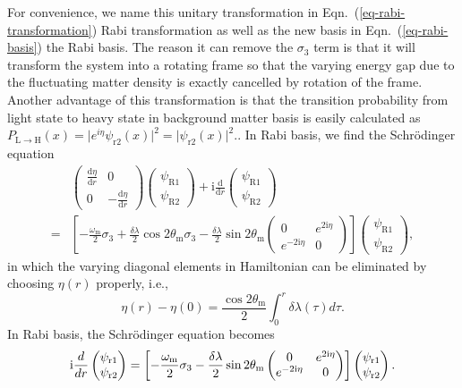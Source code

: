 For convenience, we name this unitary transformation in Eqn.~(\ref{eq-rabi-transformation}) Rabi transformation as well as the new basis in Eqn.~(\ref{eq-rabi-basis}) the Rabi basis. The reason it can remove the $\sigma_3$ term is that it will transform the system into a rotating frame so that the varying energy gap due to the fluctuating matter density is exactly cancelled by rotation of the frame. Another advantage of this transformation is that the transition probability from light state to heavy state in background matter basis is easily calculated as $P_{\mathrm{L} \to
\mathrm{H}} (x) = \lvert e^{i\eta} \psi_{\mathrm r2} (x)  \rvert^2 = \lvert \psi_{\mathrm r2} (x)  \rvert^2 .$. In Rabi basis, we find the Schr\"{o}dinger equation
\begin{align*}
    &\begin{pmatrix}  \frac{\mathrm d\eta}{\mathrm dr}  & 0 \\ 0 & - \frac{\mathrm d\eta}{\mathrm d r}  \end{pmatrix} \begin{pmatrix} \psi_{\mathrm R1} \\ \psi_{\mathrm R2} \end{pmatrix} + \mathrm i \frac{\mathrm d}{\mathrm dr} \begin{pmatrix} \psi_{\mathrm R1} \\ \psi_{\mathrm R2} \end{pmatrix} \\
    =& \left[ -\frac{\omega_{\mathrm m} }{2} \sigma_3  + \frac{\delta \lambda}{2} \cos 2\theta_{\mathrm m}  \sigma_3  - \frac{\delta \lambda}{2} \sin 2\theta_{\mathrm m} \begin{pmatrix} 0 & e^{2\mathrm i\eta} \\ e^{-2 \mathrm i\eta } & 0 \end{pmatrix}   \right] \begin{pmatrix} \psi_{\mathrm R1} \\ \psi_{\mathrm R2} \end{pmatrix},
\end{align*}
in which the varying diagonal elements in Hamiltonian can be eliminated by choosing $\eta(r)$ properly, i.e.,
\begin{equation}
    \eta(r) - \eta(0) =  \frac{\cos 2\theta_{\mathrm{m}}}{2} \int_0^r \delta\lambda (\tau) d\tau.
\end{equation}
In Rabi basis, the Schr\"{o}dinger equation becomes
\begin{equation*}
    \mathrm{i} \frac{d}{dr} \begin{pmatrix} \psi_{\mathrm r1} \\ \psi_{\mathrm r2} \end{pmatrix} = \left[ - \frac{\omega_{\mathrm m}}{2} \sigma_3 - \frac{\delta \lambda}{2} \sin 2\theta_{\mathrm m} \begin{pmatrix} 0 & e^{2\mathrm{i}\eta} \\ e^{-2 \mathrm{i} \eta } & 0 \end{pmatrix}\right] \begin{pmatrix} \psi_{\mathrm r1} \\ \psi_{\mathrm r2} \end{pmatrix}.
\end{equation*}
